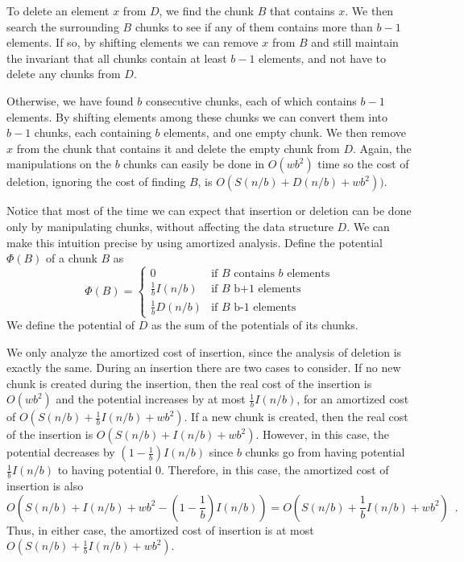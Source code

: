 To delete an element $x$ from $D$, we find the chunk $B$ that contains $x$.
We then search the surrounding $B$ chunks to see if any of them contains
more than $b-1$ elements.  If so, by shifting elements we can remove $x$
from $B$ and still maintain the invariant that all chunks contain at least
$b-1$ elements, and not have to delete any chunks from $D$. 

Otherwise, we have found $b$ consecutive chunks, each of which contains
$b-1$ elements.  By shifting elements among these chunks we can convert
them into $b-1$ chunks, each containing $b$ elements, and one empty chunk.
We then remove $x$ from the chunk that contains it and delete the empty
chunk from $D$.  Again, the manipulations on the $b$ chunks can easily be
done in $O(wb^2)$ time so the cost of deletion, ignoring the cost of finding
$B$, is $O(S(n/b) + D(n/b) + wb^2))$.

Notice that most of the time we can expect that insertion or deletion
can be done only by manipulating chunks, without affecting the data
structure $D$.  We can make this intuition precise by using amortized
analysis.  Define the potential $\Phi(B)$ of a chunk $B$ as
\[
   \Phi(B) =\left\{ \begin{array}{ll}
                     0 & \mbox{if $B$ contains $b$ elements} \\
                     \frac{1}{b}I(n/b) & \mbox{if $B$ b+1 elements} \\
                     \frac{1}{b}D(n/b) & \mbox{if $B$ b-1 elements}
                    \end{array}\right.
\]
We define the potential of $D$ as the sum of the potentials of its chunks.

We only analyze the amortized cost of insertion, since the analysis of
deletion is exactly the same.  During an insertion there are two cases
to consider.  If no new chunk is created during the insertion, then
the real cost of the insertion is $O(wb^2)$ and the potential increases
by at most $\frac{1}{b}I(n/b)$, for an amortized cost of $O(S(n/b) +
\frac{1}{b}I(n/b) + wb^2)$.  If a new chunk is created, then the real cost
of the insertion is $O(S(n/b) + I(n/b) + wb^2)$.  However, in this case,
the potential decreases by $(1-\frac{1}{b})I(n/b)$ since $b$ chunks
go from having potential $\frac{1}{b}I(n/b)$ to having potential 0.
Therefore, in this case, the amortized cost of insertion is also
\[
  O\left(S(n/b) + I(n/b) + wb^2 - \left(1-\frac{1}{b}\right)I(n/b)\right) 
    = O\left(S(n/b) + \frac{1}{b}I(n/b) + wb^2\right) \enspace .
\]
Thus, in either case, the amortized cost of insertion is at most $O(S(n/b)
+ \frac{1}{b}I(n/b) + wb^2)$.

